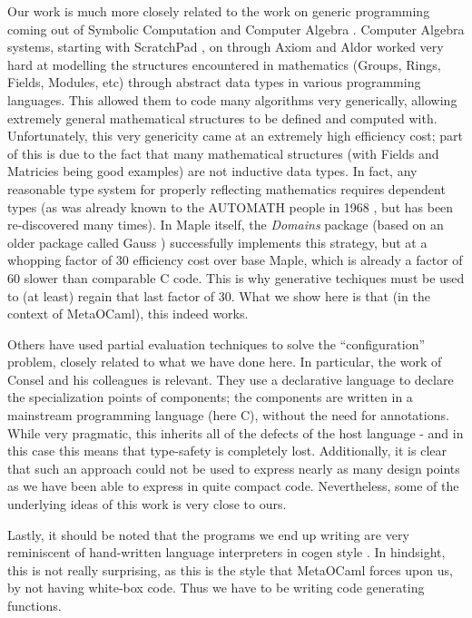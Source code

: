 \documentclass[11pt]{elsart}
\begin{document}
Our work is much more closely related to the work on generic programming
coming out of Symbolic Computation and Computer Algebra
\cite{musser89generic,Jenks:1992:ASC}.  Computer Algebra systems, starting
with ScratchPad \cite{ScratchPad}, on through Axiom \cite{Jenks:1992:ASC} and
Aldor \cite{Watt:2002:HCA} worked very hard at modelling the structures
encountered in mathematics (Groups, Rings, Fields, Modules, etc)
through abstract data types in various programming languages.  This
allowed them to code many algorithms very generically, allowing
extremely general mathematical structures to be defined and computed with.
Unfortunately, this very genericity came at an extremely high efficiency
cost; part of this is due to the fact that many mathematical structures
(with Fields and Matricies being good examples) are not inductive data
types.  In fact, any reasonable type system for properly reflecting 
mathematics requires dependent types (as was already known to the 
AUTOMATH people in 1968 \cite{Bruijn83}, but has been 
re-discovered many times).  In Maple itself, the \emph{Domains}
package (based on an older package called Gauss \cite{Gruntz:1994:IG})
successfully implements this strategy, but at a whopping factor of
30 efficiency cost over base Maple, which is already a factor of 60
slower than comparable C code.  This is why generative techiques must
be used to (at least) regain that last factor of 30.  What we show here
is that (in the context of MetaOCaml), this indeed works.

Others have used partial evaluation techniques to solve the
``configuration'' problem, closely related to what we have done here.
In particular, the work of Consel and his colleagues
\cite{lemeur-al:hosc03,Marlet-Thibault-Consel:jase99} is relevant.  They use
a declarative language to declare the specialization points of 
components; the components are written in a mainstream programming language
(here C), without the need for annotations.  While very pragmatic, this
inherits all of the defects of the host language - and in this case
this means that type-safety is completely lost.  Additionally, it is
clear that such an approach could not be used to express nearly as many
design points as we have been able to express in quite compact code.
Nevertheless, some of the underlying ideas of this work is very close
to ours.

Lastly, it should be noted that the programs we end up writing are very
reminiscent of hand-written language interpreters in cogen style
\cite{conf/pepm/BondorfD94,conf/icfp/Thiemann96}.  In hindsight,
this is not really surprising, as this is the style that MetaOCaml
forces upon us, by not having white-box code. Thus we have to be writing
code generating functions.
\end{document}

